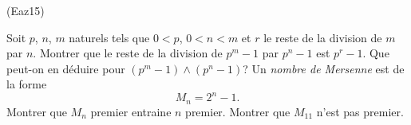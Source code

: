 \begin{tiny}(Eaz15)\end{tiny} Soit $p$, $n$, $m$ naturels tels que $0<p$, $0<n<m$ et $r$ le reste de la division de $m$ par $n$.
Montrer que le reste de la division de $p^m -1$ par $p^n -1$ est $p^r -1$.\newline
Que peut-on en déduire pour $(p^m -1) \wedge (p^n -1)$?\newline
Un \emph{nombre de Mersenne} est de la forme 
\[
 M_n = 2^n - 1.
\]
Montrer que $M_n$ premier entraine $n$ premier. Montrer que $M_{11}$ n'est pas premier.